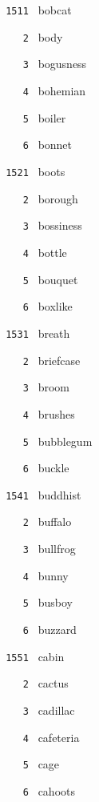 \documentclass[11pt]{article}
\begin{document}
\begin{multicols}{6}
\noindent \texttt{ 1511 } bobcat  \par
\noindent \texttt{ \ \ \ 2 } body  \par
\noindent \texttt{ \ \ \ 3 } bogusness  \par
\noindent \texttt{ \ \ \ 4 } bohemian  \par
\noindent \texttt{ \ \ \ 5 } boiler  \par
\noindent \texttt{ \ \ \ 6 } bonnet  \par
\vspace{3mm}
\noindent \texttt{ 1521 } boots  \par
\noindent \texttt{ \ \ \ 2 } borough  \par
\noindent \texttt{ \ \ \ 3 } bossiness  \par
\noindent \texttt{ \ \ \ 4 } bottle  \par
\noindent \texttt{ \ \ \ 5 } bouquet  \par
\noindent \texttt{ \ \ \ 6 } boxlike  \par
\vspace{3mm}
\noindent \texttt{ 1531 } breath  \par
\noindent \texttt{ \ \ \ 2 } briefcase  \par
\noindent \texttt{ \ \ \ 3 } broom  \par
\noindent \texttt{ \ \ \ 4 } brushes  \par
\noindent \texttt{ \ \ \ 5 } bubblegum  \par
\noindent \texttt{ \ \ \ 6 } buckle  \par
\vspace{3mm}
\noindent \texttt{ 1541 } buddhist  \par
\noindent \texttt{ \ \ \ 2 } buffalo  \par
\noindent \texttt{ \ \ \ 3 } bullfrog  \par
\noindent \texttt{ \ \ \ 4 } bunny  \par
\noindent \texttt{ \ \ \ 5 } busboy  \par
\noindent \texttt{ \ \ \ 6 } buzzard  \par
\vspace{3mm}
\noindent \texttt{ 1551 } cabin  \par
\noindent \texttt{ \ \ \ 2 } cactus  \par
\noindent \texttt{ \ \ \ 3 } cadillac  \par
\noindent \texttt{ \ \ \ 4 } cafeteria  \par
\noindent \texttt{ \ \ \ 5 } cage  \par
\noindent \texttt{ \ \ \ 6 } cahoots  \par

\end{multicols}
\end{document}
